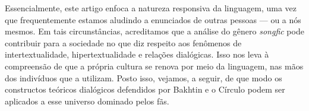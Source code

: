 Essencialmente, este artigo enfoca a natureza responsiva da linguagem,
uma vez que frequentemente estamos aludindo a enunciados de outras
pessoas --- ou a nós mesmos. Em tais circunstâncias, acreditamos que a
análise do gênero \emph{songfic} pode contribuir para a sociedade no que
diz respeito aos fenômenos de intertextualidade, hipertextualidade e
relações dialógicas. Isso nos leva à compreensão de que a própria
cultura se renova por meio da linguagem, nas mãos dos indivíduos que a
utilizam. Posto isso, vejamos, a seguir, de que modo os constructos
teóricos dialógicos defendidos por Bakhtin e o Círculo podem ser
aplicados a esse universo dominado pelos fãs.
